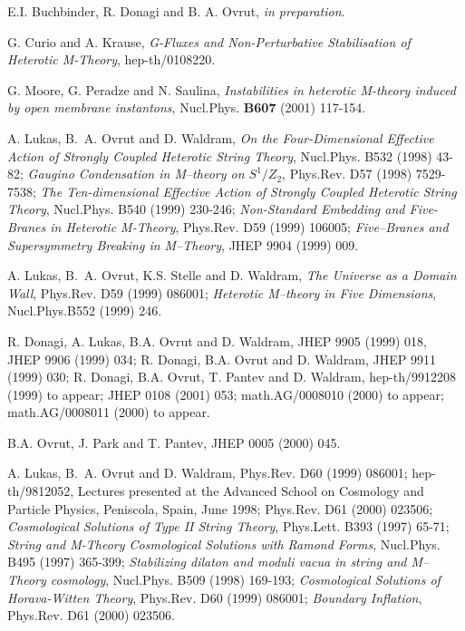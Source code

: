 \documentclass[a4paper,12pt]{article}
\numberwithin{equation}{section}
\theoremstyle{plain}
\begin{document}
\begin{thebibliography}{99}
  E.I. Buchbinder, R. Donagi and B. A. Ovrut,
{\em in preparation}.

  G. Curio and A. Krause, {\em G-Fluxes and
Non-Perturbative Stabilisation of Heterotic M-Theory}, hep-th/0108220.

  G. Moore, G. Peradze and N. Saulina,
{\em Instabilities in heterotic M-theory induced by open membrane
instantons},
Nucl.Phys. {\bf B607} (2001) 117-154.

 A. Lukas, B.~A. Ovrut and D. Waldram, {\em On the
    Four-Dimensional Effective Action of Strongly Coupled Heterotic
    String Theory}, Nucl.Phys. B532 (1998) 43-82; {\em Gaugino
Condensation in M--theory on $S^1/Z_2$}, Phys.Rev. D57 (1998) 7529-7538;
{\em The
    Ten-dimensional Effective Action of Strongly Coupled Heterotic String
Theory}, Nucl.Phys. B540 (1999) 230-246;
{\em Non-Standard Embedding and Five-Branes in
Heterotic M-Theory}, Phys.Rev. D59 (1999) 106005;
{\em Five--Branes and Supersymmetry Breaking in M--Theory}, JHEP 9904
(1999)
009.

 A. Lukas, B.~A. Ovrut, K.S. Stelle and D. Waldram,
               {\em The Universe as a Domain Wall}, Phys.Rev. D59 (1999)
               086001;  {\em Heterotic M--theory in Five Dimensions},
Nucl.Phys.B552 (1999) 246.

 R. Donagi, A. Lukas, B.A. Ovrut and D. Waldram, JHEP 9905
(1999) 018, JHEP 9906 (1999) 034; R. Donagi, B.A. Ovrut and D. Waldram,
JHEP 9911 (1999) 030; R. Donagi, B.A. Ovrut, T. Pantev and D. Waldram,
hep-th/9912208 (1999) to appear; JHEP 0108 (2001) 053; math.AG/0008010
(2000)
to appear; math.AG/0008011 (2000) to appear.

 B.A. Ovrut, J. Park and T. Pantev, JHEP 0005 (2000) 045.

  A. Lukas, B.~A. Ovrut and D. Waldram, Phys.Rev. D60 (1999)
        086001; hep-th/9812052, Lectures presented at the Advanced School
on Cosmology and Particle Physics, Peniscola, Spain, June 1998;
Phys.Rev. D61 (2000) 023506; {\em Cosmological Solutions of Type II String
Theory}, Phys.Lett. B393 (1997) 65-71; {\em String and M-Theory
Cosmological
Solutions with Ramond Forms}, Nucl.Phys. B495 (1997) 365-399;
{\em Stabilizing dilaton and moduli vacua in string and M--Theory
cosmology},
Nucl.Phys. B509 (1998) 169-193; {\em Cosmological Solutions of
Horava-Witten
Theory},  Phys.Rev. D60 (1999) 086001; {\em Boundary Inflation},
Phys.Rev.
D61 (2000) 023506.


\end{thebibliography}
\end{document}
